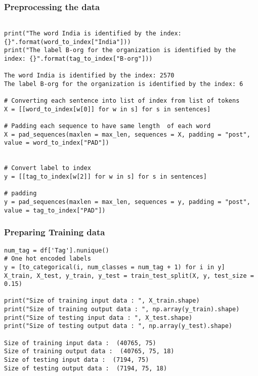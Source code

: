 \begin{frame}[fragile]\frametitle{Preprocessing the data}

\begin{lstlisting}

print("The word India is identified by the index: {}".format(word_to_index["India"]))
print("The label B-org for the organization is identified by the index: {}".format(tag_to_index["B-org"]))

The word India is identified by the index: 2570
The label B-org for the organization is identified by the index: 6

# Converting each sentence into list of index from list of tokens
X = [[word_to_index[w[0]] for w in s] for s in sentences]

# Padding each sequence to have same length  of each word
X = pad_sequences(maxlen = max_len, sequences = X, padding = "post", value = word_to_index["PAD"])


# Convert label to index
y = [[tag_to_index[w[2]] for w in s] for s in sentences]

# padding
y = pad_sequences(maxlen = max_len, sequences = y, padding = "post", value = tag_to_index["PAD"])
\end{lstlisting}
\end{frame}

\begin{frame}[fragile]\frametitle{Preparing Training data}

\begin{lstlisting}
num_tag = df['Tag'].nunique()
# One hot encoded labels
y = [to_categorical(i, num_classes = num_tag + 1) for i in y]
X_train, X_test, y_train, y_test = train_test_split(X, y, test_size = 0.15)

print("Size of training input data : ", X_train.shape)
print("Size of training output data : ", np.array(y_train).shape)
print("Size of testing input data : ", X_test.shape)
print("Size of testing output data : ", np.array(y_test).shape)

Size of training input data :  (40765, 75)
Size of training output data :  (40765, 75, 18)
Size of testing input data :  (7194, 75)
Size of testing output data :  (7194, 75, 18)
\end{lstlisting}
\end{frame}

